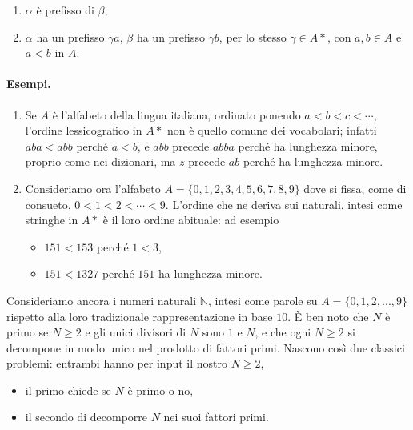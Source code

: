 \begin{enumerate}
    \item $\alpha$ è prefisso di $\beta$,
    \item $\alpha$ ha un prefisso $\gamma a$,
          $\beta$ ha un prefisso $\gamma b$, per lo stesso $\gamma \in A*$,
          con $a, b \in A$ e $a < b$ in $A$.
\end{enumerate}

\paragraph{Esempi.}
\begin{enumerate}
    \item Se $A$ è l'alfabeto della lingua italiana, ordinato ponendo
          $a < b < c < \cdots$,
          l'ordine lessicografico in $A*$ non è quello comune dei vocabolari;
          infatti $aba < abb$ perché $a < b$, e $abb$ precede $abba$ perché ha lunghezza
          minore, proprio
          come nei dizionari, ma $z$ precede $ab$ perché ha lunghezza minore.
    \item Consideriamo ora l'alfabeto $A = \{0, 1, 2, 3, 4, 5, 6, 7, 8, 9\}$
          dove si fissa, come di consueto, $0 < 1 < 2 < \cdots < 9$.
          L'ordine che ne deriva sui naturali, intesi
          come stringhe in $A*$ è il loro ordine abituale: ad esempio
          \begin{itemize}
              \item $151 < 153$ perché $1 < 3$,
              \item $151 < 1327$ perché $151$ ha lunghezza minore.
          \end{itemize}
\end{enumerate}

Consideriamo ancora i numeri naturali $\mathbb{N}$,
intesi come parole su $A = \{0, 1, 2, ..., 9\}$ rispetto alla loro tradizionale
rappresentazione in base $10$. È ben noto che
$N$ è primo se $N \ge 2$ e gli unici divisori di $N$ sono $1$ e $N$,
e che ogni $N \ge 2$ si decompone in modo unico nel prodotto di fattori primi.
Nascono così due classici problemi: entrambi hanno per input il nostro $N \ge 2$,

\begin{itemize}
    \item il primo chiede se $N$ è primo o no,
    \item il secondo di decomporre $N$ nei suoi fattori primi.
\end{itemize}

